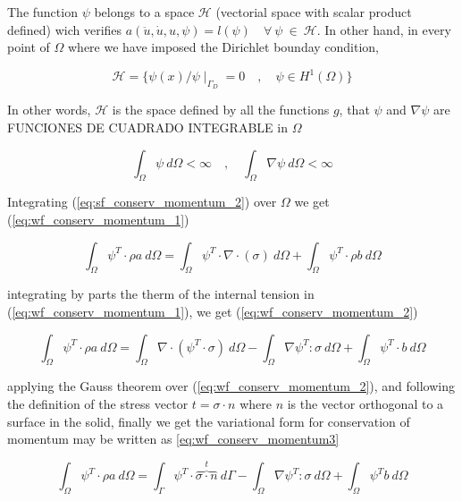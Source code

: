 \message{ !name(../../../mpm.tex)}\documentclass[10pt,a4paper]{article}
\begin{document}
The function $\psi$ belongs to a space $\mathcal{H}$ (vectorial space
with scalar product defined) wich verifies
$a(\ddot{u},\dot{u},u,\psi)=l(\psi) \quad \forall\ \psi\ \in\
\mathcal{H}$. In other hand, in every point of $\Omega$ where we have
imposed the Dirichlet bounday condition,


\begin{equation}
  \label{eq:hilbert_space}
  \mathcal{H} = \{  \psi(x)/\psi \mid_{\Gamma_D} = 0 \quad , \quad \psi \in H^1(\Omega)  \}
\end{equation}

In other words, $\mathcal{H}$ is the space defined by all the
functions $g$, that $ \psi$ and $\nabla \psi$ are FUNCIONES DE
CUADRADO INTEGRABLE in $\Omega$

\begin{equation}
  \label{eq:def_psi}
  \int_{\Omega}\psi\ d\Omega < \infty \quad , \quad \int_{\Omega}\nabla\psi\ d\Omega < \infty
\end{equation}

Integrating (\ref{eq:sf_conserv_momentum_2}) over $\Omega$ we get
(\ref{eq:wf_conserv_momentum_1})

\begin{equation}
  \label{eq:wf_conserv_momentum_1}
  \int_{\Omega} \psi^T \cdot \rho a\ d\Omega = \int_{\Omega} \psi^T \cdot \nabla\cdot(\sigma)\ d\Omega + \int_{\Omega} \psi^T \cdot \rho b\ d\Omega
\end{equation}

integrating by parts the therm of the internal tension in
(\ref{eq:wf_conserv_momentum_1}), we get (\ref{eq:wf_conserv_momentum_2})

\begin{equation}
  \label{eq:wf_conserv_momentum_2}
  \int_{\Omega} \psi^T\cdot \rho a\ d\Omega = \int_{\Omega}  \nabla\cdot \left( \psi^T \cdot
    \sigma \right)\ d\Omega - \int_{\Omega}  \nabla\psi^T : \sigma\ d\Omega
  + \int_{\Omega} \psi^T\cdot b\ d\Omega
\end{equation}

applying the Gauss theorem over (\ref{eq:wf_conserv_momentum_2}), and following the definition of the stress
vector $t = \sigma \cdot n$ where $n$ is the vector orthogonal to a
surface in the solid, finally we get the variational form for
conservation of momentum may be written as
\ref{eq:wf_conserv_momentum3}

\begin{equation}
  \label{eq:wf_conserv_momentum3}
  \int_{\Omega} \psi^T \cdot \rho a\ d\Omega = \int_{\Gamma}  \psi^T
  \cdot \overbrace{\sigma \cdot n}^{t}\ d\Gamma - \int_{\Omega}  \nabla \psi^T : \sigma\ d\Omega
  + \int_{\Omega} \psi^T b\ d\Omega  
\end{equation}
\end{document}
